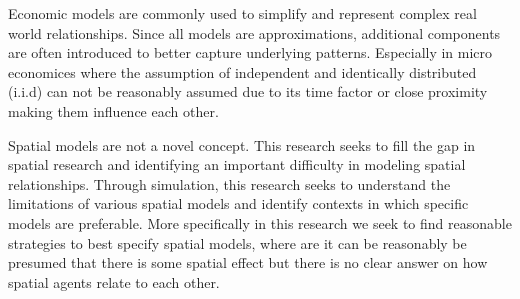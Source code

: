 
Economic models are commonly used to simplify and represent complex real world relationships.
Since all models are approximations, additional components are often introduced to better capture
underlying patterns. Especially in micro economices where the assumption of independent and identically
distributed (i.i.d) can not be reasonably assumed due to its time factor or close proximity making
them influence each other.

Spatial models are not a novel concept. This research seeks to fill the
gap in spatial research and identifying an important difficulty in modeling spatial relationships.
Through simulation, this research seeks to understand the limitations of various spatial models
and identify contexts in which specific models are preferable. More specifically in this research
we seek to find reasonable strategies to best specify spatial models, where are it can be reasonably
be presumed that there is some spatial effect but there is no clear answer on how spatial agents relate to each other.
